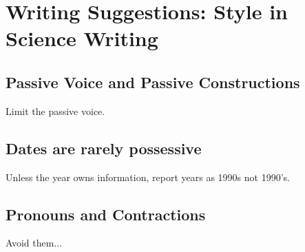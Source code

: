 \documentclass{tufte-handout}\usepackage[]{graphicx}\usepackage[]{color}
\newenvironment{enumerate*}%
  {\begin{enumerate}%
    \setlength{\itemsep}{0pt}%
    \setlength{\parskip}{0pt}}%
  {\end{enumerate}}
\begin{document}





\section{Writing Suggestions: Style in Science Writing}

\subsection{Passive Voice and Passive Constructions}

Limit the passive voice.

\subsection{Dates are rarely possessive}

Unless the year owns information, report years as 1990s not 1990's. 

\subsection{Pronouns and Contractions}

Avoid them...
\end{document}
